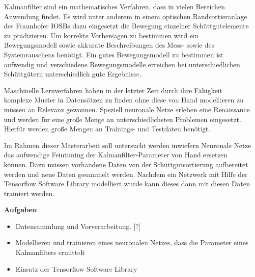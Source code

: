 \documentclass [a4paper, 10pt]{scrartcl}
\begin{document}
\Anfang
Kalmanfilter sind ein mathematisches Verfahren, dass in vielen Bereichen Anwendung findet. 
Es wird unter anderem in einem optischen Bandsortieranlage des Fraunhofer IOSBs dazu eingesetzt die Bewegung einzelner Schüttgutelemente zu prädizieren.
Um korrekte Vorhersagen zu bestimmen wird ein Bewegungsmodell sowie akkurate Beschreibungen des Mess- sowie des Systemrauschens benötigt.
Ein gutes Bewegungsmodell zu bestimmen ist aufwendig und verschiedene Bewegungsmodelle erreichen bei unterschiedlichen Schüttgütern unterschiedlich gute Ergebnisse.


Maschinelle Lernverfahren haben in der letzter Zeit durch ihre Fähigkeit 
komplexe Muster in Datensätzen zu finden ohne diese von Hand modellieren zu müssen an Relevanz gewonnen.
Speziell neuronale Netze erleben eine Renaissance und werden für eine große Menge an unterschiedlichsten Problemen eingesetzt.
Hierfür werden große Mengen an Trainings- und Testdaten benötigt. 

Im Rahmen dieser Masterarbeit soll untersucht werden inwiefern Neuronale Netze das aufwendige Feintuning der Kalmanfilter-Parameter von Hand ersetzen können.
Dazu müssen vorhandene Daten von der Schüttgutsortierung aufbereitet werden und neue Daten gesammelt werden.
Nachdem ein Netzwerk mit Hilfe der Tensorflow Software Library modelliert wurde kann dieses dann mit diesen Daten trainiert werden.





\textbf{Aufgaben}
\begin{itemize}
  \item Datensammlung und Vorverarbeitung. [?]
  \item Modellieren und trainieren eines neuronalen Netzes, dass die Parameter eines Kalmanfilters ermittelt
  \item Einsatz der Tensorflow Software Library
\end{itemize}
\Ende
\end{document}
